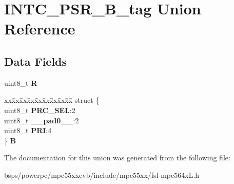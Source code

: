 \hypertarget{unionINTC__PSR__8B__tag}{}\section{I\+N\+T\+C\+\_\+\+P\+S\+R\+\_\+B\+\_\+tag Union Reference}
\label{unionINTC__PSR__8B__tag}
\subsection*{Data Fields}
\begin{DoxyCompactItemize}
\item 
\mbox{\label{unionINTC__PSR__8B__tag_aa8e83e4981a55ad60fcf420e55ed87c2}} 
uint8\+\_\+t {\bfseries R}
\item 
\mbox{\label{unionINTC__PSR__8B__tag_a1eefbe86273a0873fb2a0e9f4ad6477a}} 
\begin{tabbing}
xx\=xx\=xx\=xx\=xx\=xx\=xx\=xx\=xx\=\kill
struct \{\\
\>uint8\_t {\bfseries PRC\_SEL}:2\\
\>uint8\_t {\bfseries \_\_pad0\_\_}:2\\
\>uint8\_t {\bfseries PRI}:4\\
\} {\bfseries B}\\

\end{tabbing}\end{DoxyCompactItemize}


The documentation for this union was generated from the following file\+:\begin{DoxyCompactItemize}
\item 
bsps/powerpc/mpc55xxevb/include/mpc55xx/fsl-\/mpc564x\+L.\+h\end{DoxyCompactItemize}
